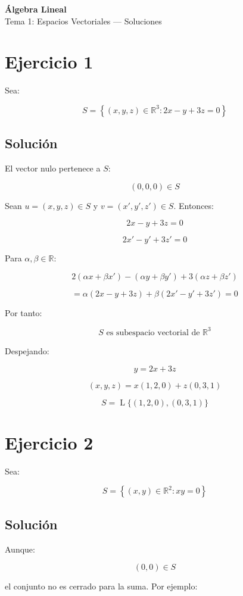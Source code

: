 \documentclass[11pt,a4paper]{article}
\newcommand{\R}{\mathbb{R}}
\newcommand{\Span}{\operatorname{L}}
\begin{document}
\begin{center}
	{\LARGE\bfseries Álgebra Lineal}\\[0.4em]
	{\Large Tema 1: Espacios Vectoriales --- Soluciones}
\end{center}

\section{Ejercicio 1}
	Sea:

	\[
	S=
	\left\{
	(x,y,z)\in\R^3:
	2x-y+3z=0
	\right\}
	\]

	\subsection{Solución}

	El vector nulo pertenece a $S$:

	\[
	(0,0,0)\in S
	\]

	Sean $u=(x,y,z)\in S$ y $v=(x',y',z')\in S$. Entonces:

	\[
	2x-y+3z=0
	\]

	\[
	2x'-y'+3z'=0
	\]

	Para $\alpha,\beta\in\R$:

	\[
	2(\alpha x+\beta x')
	-(\alpha y+\beta y')
	+3(\alpha z+\beta z')
	\]

	\[
	=
	\alpha(2x-y+3z)
	+
	\beta(2x'-y'+3z')
	=
	0
	\]

	Por tanto:

	\[
	\boxed{S\text{ es subespacio vectorial de }\R^3}
	\]

	Despejando:

	\[
	y=2x+3z
	\]

	\[
	(x,y,z)
	=
	x(1,2,0)+z(0,3,1)
	\]

	\[
	\boxed{
	S=
	\Span\{(1,2,0),(0,3,1)\}
	}
	\]

\section{Ejercicio 2}
	Sea:

	\[
	S=
	\left\{
	(x,y)\in\R^2:
	xy=0
	\right\}
	\]

	\subsection{Solución}

	Aunque:

	\[
	(0,0)\in S
	\]

	el conjunto no es cerrado para la suma. Por ejemplo:
\end{document}
